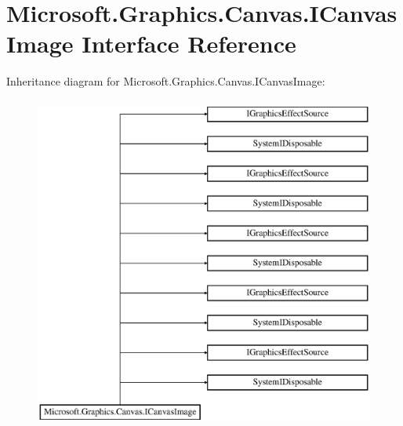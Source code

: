 \hypertarget{interface_microsoft_1_1_graphics_1_1_canvas_1_1_i_canvas_image}{}\section{Microsoft.\+Graphics.\+Canvas.\+I\+Canvas\+Image Interface Reference}
\label{interface_microsoft_1_1_graphics_1_1_canvas_1_1_i_canvas_image}
Inheritance diagram for Microsoft.\+Graphics.\+Canvas.\+I\+Canvas\+Image\+:\begin{figure}[H]
\begin{center}
\leavevmode
\includegraphics[height=11.000000cm]{interface_microsoft_1_1_graphics_1_1_canvas_1_1_i_canvas_image}
\end{center}
\end{figure}
